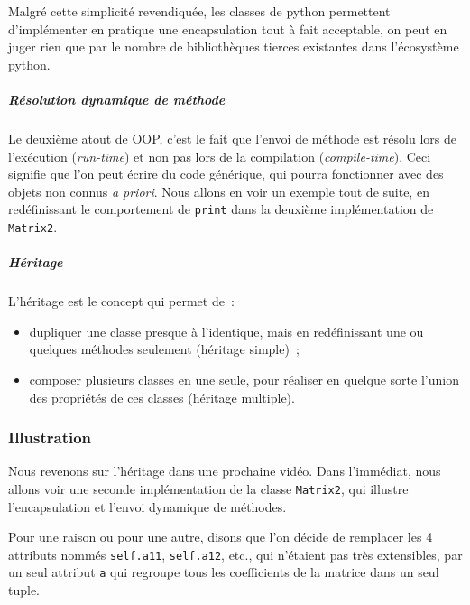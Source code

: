 Malgré cette simplicité revendiquée, les classes de python permettent
d'implémenter en pratique une encapsulation tout à fait acceptable, on
peut en juger rien que par le nombre de bibliothèques tierces existantes
dans l'écosystème python.

    \hypertarget{ruxe9solution-dynamique-de-muxe9thode}{%
\subparagraph{Résolution dynamique de
méthode}\label{ruxe9solution-dynamique-de-muxe9thode}}

    Le deuxième atout de OOP, c'est le fait que l'envoi de méthode est
résolu lors de l'exécution (\emph{run-time}) et non pas lors de la
compilation (\emph{compile-time}). Ceci signifie que l'on peut écrire du
code générique, qui pourra fonctionner avec des objets non connus
\emph{a priori}. Nous allons en voir un exemple tout de suite, en
redéfinissant le comportement de \texttt{print} dans la deuxième
implémentation de \texttt{Matrix2}.

    \hypertarget{huxe9ritage}{%
\subparagraph{Héritage}\label{huxe9ritage}}

    L'héritage est le concept qui permet de~:

\begin{itemize}
\tightlist
\item
  dupliquer une classe presque à l'identique, mais en redéfinissant une
  ou quelques méthodes seulement (héritage simple)~;
\item
  composer plusieurs classes en une seule, pour réaliser en quelque
  sorte l'union des propriétés de ces classes (héritage multiple).
\end{itemize}

    \hypertarget{illustration}{%
\subsubsection{Illustration}\label{illustration}}

    Nous revenons sur l'héritage dans une prochaine vidéo. Dans l'immédiat,
nous allons voir une seconde implémentation de la classe
\texttt{Matrix2}, qui illustre l'encapsulation et l'envoi dynamique de
méthodes.

    Pour une raison ou pour une autre, disons que l'on décide de remplacer
les 4 attributs nommés \texttt{self.a11}, \texttt{self.a12}, etc., qui
n'étaient pas très extensibles, par un seul attribut \texttt{a} qui
regroupe tous les coefficients de la matrice dans un seul tuple.

